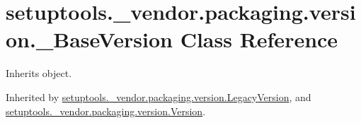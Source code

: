 \hypertarget{classsetuptools_1_1__vendor_1_1packaging_1_1version_1_1___base_version}{}\section{setuptools.\+\_\+vendor.\+packaging.\+version.\+\_\+\+Base\+Version Class Reference}
\label{classsetuptools_1_1__vendor_1_1packaging_1_1version_1_1___base_version}


Inherits object.



Inherited by \hyperlink{classsetuptools_1_1__vendor_1_1packaging_1_1version_1_1_legacy_version}{setuptools.\+\_\+vendor.\+packaging.\+version.\+Legacy\+Version}, and \hyperlink{classsetuptools_1_1__vendor_1_1packaging_1_1version_1_1_version}{setuptools.\+\_\+vendor.\+packaging.\+version.\+Version}.

